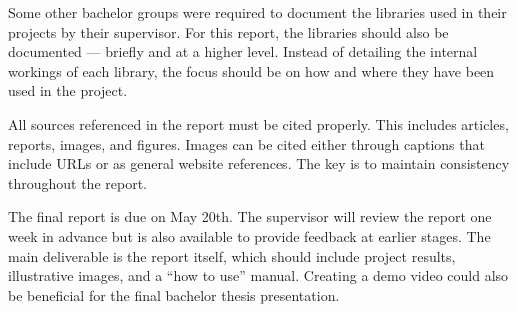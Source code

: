 Some other bachelor groups were required to document the libraries used in their projects by their supervisor. For this report, the libraries should also be documented — briefly and at a higher level. Instead of detailing the internal workings of each library, the focus should be on how and where they have been used in the project.

All sources referenced in the report must be cited properly. This includes articles, reports, images, and figures. Images can be cited either through captions that include URLs or as general website references. The key is to maintain consistency throughout the report.

The final report is due on May 20th. The supervisor will review the report one week in advance but is also available to provide feedback at earlier stages. The main deliverable is the report itself, which should include project results, illustrative images, and a “how to use” manual. Creating a demo video could also be beneficial for the final bachelor thesis presentation.


